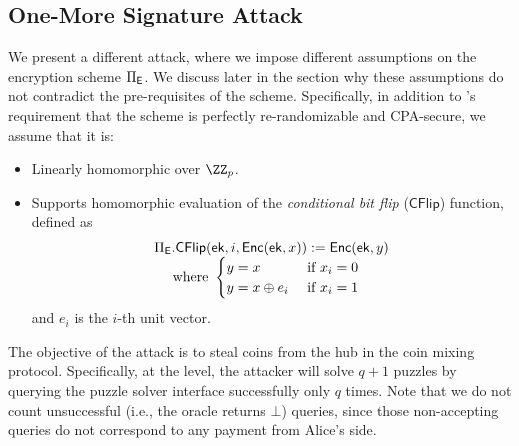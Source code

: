 \subsection{One-More Signature Attack}\label{sec:attack2}

We present a different attack, where we impose different assumptions on the encryption scheme $\Pi_{\mathsf{E}}$. We discuss later in the section why these assumptions do not contradict the pre-requisites of the \aal scheme. Specifically, in addition to \aal's requirement that the scheme is perfectly re-randomizable and CPA-secure, we assume that it is:
\begin{itemize}
    \item Linearly homomorphic over $\ZZ_p$.
    \item Supports homomorphic evaluation of the \emph{conditional bit flip} ($\mathsf{CFlip}$) function, defined as
    $$
    \begin{array}{l}
    \Pi_{\mathsf{E}}.\mathsf{CFlip}(\mathsf{ek}, i, {\mathsf{Enc}}(\mathsf{ek}, x)) := {\mathsf{Enc}}(\mathsf{ek}, y)\\
    ~~~~\text{where } \begin{cases} y = x &\text{ if } x_i = 0\\ y = x \oplus e_i &\text{ if } x_i = 1
    \end{cases}
    \end{array}
    $$
    and $e_i$ is the $i$-th unit vector.
\end{itemize}
 The objective of the attack is to steal coins from the hub in the coin mixing protocol. Specifically, at the \aal level, the attacker will solve $q+1$ puzzles by querying the puzzle solver interface successfully only $q$ times. Note that we do not count unsuccessful (i.e., the oracle returns $\bot$) queries, since those non-accepting queries do not correspond to any payment from Alice's side.







